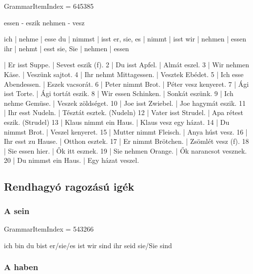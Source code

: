 \documentclass{article}
\newenvironment{desc}{\verbatim}{\endverbatim}
\newenvironment{exmp}{\verbatim}{\endverbatim}
\begin{document}
GrammarItemIndex = 645385

\begin{desc}
essen - eszik
nehmen - vesz

ich         | nehme  | esse 
du          | nimmst | isst 
er, sie, es | nimmt  | isst 
wir         | nehmen | essen 
ihr         | nehmt  | esst 
sie, Sie    | nehmen | essen 
\end{desc}

\begin{exmp}
1 | Er isst Suppe. | Sevest eszik (f).
2 | Du isst Apfel. | Almát eszel.
3 | Wir nehmen Käse. | Veszünk sajtot.
4 | Ihr nehmt Mittagessen. | Vesztek Ebédet.
5 | Ich esse Abendessen. | Eszek vacsorát.
6 | Peter nimmt Brot. | Péter vesz kenyeret.
7 | Ági isst Torte. | Ági tortát eszik.
8 | Wir essen Schinken. | Sonkát eszünk.
9 | Ich nehme Gemüse. | Veszek zöldséget.
10 | Joe isst Zwiebel. | Joe hagymát eszik.
11 | Ihr esst Nudeln. | Tésztát esztek. (Nudeln)
12 | Vater isst Strudel. | Apa rétest eszik. (Strudel)
13 | Klaus nimmt ein Haus. | Klaus vesz egy házat.
14 | Du nimmst Brot. | Veszel kenyeret.
15 | Mutter nimmt Fleisch. | Anya húst vesz.
16 | Ihr esst zu Hause. | Otthon esztek.
17 | Er nimmt Brötchen. | Zsömlét vesz (f).
18 | Sie essen hier. | Ők itt esznek.
19 | Sie nehmen Orange. | Ők narancsot vesznek.
20 | Du nimmst ein Haus. | Egy házat veszel.
\end{exmp}

\subsection{Rendhagyó ragozású igék}

\subsubsection{A sein}

GrammarItemIndex = 543266

\begin{desc}
ich bin 
du bist 
er/sie/es ist 
wir sind 
ihr seid 
sie/Sie sind 
\end{desc}

\begin{exmp}
\end{exmp}

\subsubsection{A haben}
\end{document}
